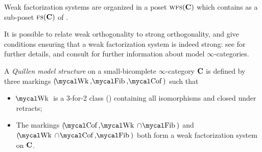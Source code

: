Weak factorization systems are organized in a poset $\text{\scshape wfs}(\textbf{C})$ which contains as a sub\hyp{}poset $\text{\scshape fs}(\textbf{C})$ of \adef {}.

It is possible to relate weak orthogonality to strong orthogonality, and give conditions ensuring that a weak factorization system is indeed strong: see \cite[\S\textbf{1}]{RT} for further details, and consult \cite{Aaron} for further information about model $\infty$\hyp{}categories.
\begin{example}\label{df:infty.model.cat}
A \emph{Quillen model structure} on a small\hyp{}bicomplete $\infty$\hyp{}category $\textbf{C}$ is defined by three markings $(\mcal{Wk},\mcal{Fib},\mcal{Cof})$ such that
\begin{itemize}
\item $\mcal{Wk}$ is a 3\hyp{}for\hyp{}2 class (\adef {}) containing all isomorphisms and closed under retracts;
\item The markings $(\mcal{Cof},\mcal{Wk}\cap \mcal{Fib})$ and $(\mcal{Wk}\cap \mcal{Cof},\mcal{Fib})$ both form a weak factorization system on $\textbf{C}$.
\end{itemize} 
\end{example}
